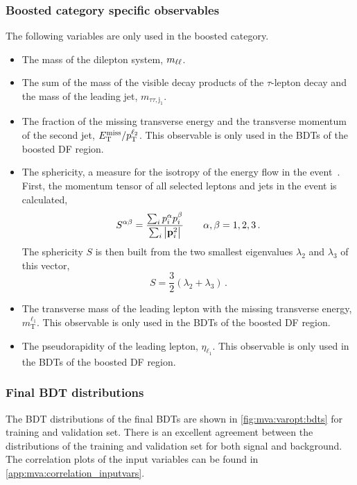 \subsubsection{Boosted category specific observables}
The following variables are only used in the boosted category.
\begin{itemize}
    \item The mass of the dilepton system, $m_{\ell\ell}$.
    \item The sum of the mass of the visible decay products of the $\tau$-lepton decay and the mass of the leading jet, $m_{\tau\tau,\text{j}_1} $.
    \item The fraction of the missing transverse energy and the transverse momentum of the second jet, $E_\text{T}^\text{miss} / p_\text{T}^{\ell_2}$.
        This observable is only used in the BDTs of the boosted DF region.
    \item The sphericity, a measure for the isotropy of the energy flow in the event~\cite{Sphericity}.
          First, the momentum tensor of all selected leptons and jets in the event is calculated,
          \begin{equation}
              S^{\alpha\beta} = \frac{\sum_i p_i^\alpha p_i^\beta}{\sum_i \left|\mathbf{p}_i^2\right|} \qquad \alpha, \beta = 1,2, 3 \,.
          \end{equation}
          The sphericity $S$ is then built from the two smallest eigenvalues $\lambda_2$ and $\lambda_3$ of this vector,
          \begin{equation}
              \label{eq:mva:sphericity}
              S = \frac{3}{2} \left( \lambda_2 + \lambda_3 \right) \,.
          \end{equation}
    \item The transverse mass of the leading lepton with the missing transverse energy, $m_\text{T}^{\ell_1}$.
        This observable is only used in the BDTs of the boosted DF region.
    \item The pseudorapidity of the leading lepton, $\eta_{\ell_1}$.
        This observable is only used in the BDTs of the boosted DF region.
\end{itemize}


\subsubsection{Final BDT distributions}

The BDT distributions of the final BDTs are shown in \cref{fig:mva:varopt:bdts} for training and validation set.
There is an excellent agreement between the distributions of the training and validation set for both signal and background.
The correlation plots of the input variables can be found in \cref{app:mva:correlation_inputvars}.


